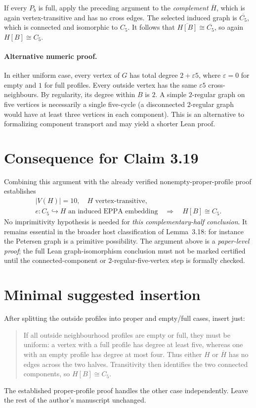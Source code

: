 \documentclass[11pt,a4paper]{article}
\begin{document}
If every \(P_b\) is full, apply the preceding
argument to the \emph{complement} \(\overline H\),
which is again vertex-transitive and has no cross
edges. The selected induced graph is
\(\overline{C_5}\), which is connected and isomorphic
to \(C_5\). It follows that
\(\overline{H[B]}\cong\overline{C_5}\),
so again \(H[B]\cong C_5\).

\paragraph{Alternative numeric proof.}
In either uniform case, every vertex of \(G\)
has total degree \(2+\varepsilon 5\),
where \(\varepsilon=0\) for empty and \(1\) for full
profiles. Every outside vertex has the same
\(\varepsilon 5\) cross-neighbours.
By regularity, its degree within \(B\) is \(2\).
A simple \(2\)-regular graph on five vertices
is necessarily a single five-cycle
(a disconnected \(2\)-regular graph would have
at least three vertices in each component).
This is an alternative to formalizing component
transport and may yield a shorter Lean proof.

\section*{Consequence for Claim 3.19}
Combining this argument with the already verified
nonempty-proper-profile proof establishes
\[
\boxed{\begin{gathered}
 |V(H)|=10,\quad H\text{ vertex-transitive},\\
 e:C_5\hookrightarrow H\text{ an induced EPPA embedding}
 \quad\Longrightarrow\quad H[B]\cong C_5 .
\end{gathered}}
\]
No imprimitivity hypothesis is needed for
\emph{this complementary-half conclusion}.
It remains essential in the broader host
classification of Lemma~3.18: for instance
the Petersen graph is a primitive possibility.
The argument above is a \emph{paper-level proof};
the full Lean graph-isomorphism conclusion must
not be marked certified until the connected-component
or \(2\)-regular-five-vertex step is formally checked.

\section*{Minimal suggested insertion}
After splitting the outside profiles into proper and
empty/full cases, insert just:
\begin{quote}
If all outside neighbourhood profiles are empty or full,
they must be uniform: a vertex with a full profile has
degree at least five, whereas one with an empty profile
has degree at most four. Thus either \(H\) or
\(\overline H\) has no edges across the two halves.
Transitivity then identifies the two connected
components, so \(H[B]\cong C_5\).
\end{quote}
The established proper-profile proof handles the other
case independently. Leave the rest of the
author's manuscript unchanged.
\end{document}

